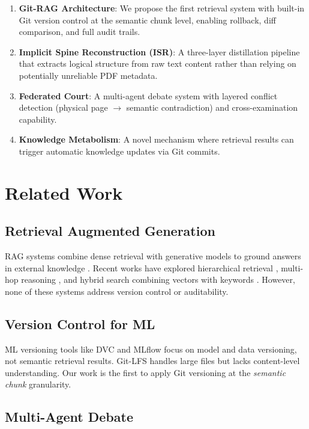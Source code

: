 \documentclass[11pt]{article}
\begin{document}
\begin{enumerate}
    \item \textbf{Git-RAG Architecture}: We propose the first retrieval system with built-in Git version control at the semantic chunk level, enabling rollback, diff comparison, and full audit trails.
    \item \textbf{Implicit Spine Reconstruction (ISR)}: A three-layer distillation pipeline that extracts logical structure from raw text content rather than relying on potentially unreliable PDF metadata.
    \item \textbf{Federated Court}: A multi-agent debate system with layered conflict detection (physical page $\rightarrow$ semantic contradiction) and cross-examination capability.
    \item \textbf{Knowledge Metabolism}: A novel mechanism where retrieval results can trigger automatic knowledge updates via Git commits.
\end{enumerate}

\section{Related Work}

\subsection{Retrieval Augmented Generation}

RAG systems combine dense retrieval with generative models to ground answers in external knowledge \cite{lewis2020retrieval}. Recent works have explored hierarchical retrieval \cite{wang2023hierarchical}, multi-hop reasoning \cite{press2022measuring}, and hybrid search combining vectors with keywords \cite{zhao2023hybrid}. However, none of these systems address version control or auditability.

\subsection{Version Control for ML}

ML versioning tools like DVC \cite{iter2020dvc} and MLflow \cite{zaharia2018mlflow} focus on model and data versioning, not semantic retrieval results. Git-LFS handles large files but lacks content-level understanding. Our work is the first to apply Git versioning at the \textit{semantic chunk} granularity.

\subsection{Multi-Agent Debate}
\end{document}
